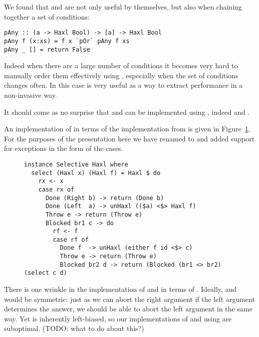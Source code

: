 We found that  and  are not only useful by
themselves, but also when chaining together a set of conditions:

\begin{verbatim}
pAny :: (a -> Haxl Bool) -> [a] -> Haxl Bool
pAny f (x:xs) = f x `pOr` pAny f xs
pAny _ [] = return False
\end{verbatim}

Indeed when there are a large number of conditions it becomes very
hard to manually order them effectively using , especially
when the set of conditions changes often. In this case  is
very useful as a way to extract performance in a non-invasive way.

It should come as no surprise that  and  can be
implemented using , indeed  and
.

An implementation of  in terms of the \Haxl implementation
from \citet{marlow2014haxl} is given in Figure~\ref{fig-haxl-select}.  For the
purposes of the presentation here we have renamed  to
 and added support for exceptions in the form of the
 cases.

\begin{figure}
\begin{verbatim}
instance Selective Haxl where
  select (Haxl x) (Haxl f) = Haxl $ do
    rx <- x
    case rx of
      Done (Right b) -> return (Done b)
      Done (Left  a) -> unHaxl (($a) <$> Haxl f)
      Throw e -> return (Throw e)
      Blocked br1 c -> do
        rf <- f
        case rf of
          Done f  -> unHaxl (either f id <$> c)
          Throw e -> return (Throw e)
          Blocked br2 d -> return (Blocked (br1 <> br2) (select c d)
\end{verbatim}
\label{fig-haxl-select}
\end{figure}

There is one wrinkle in the implementation of  and 
in terms of . Ideally,  and  would be
symmetric: just as we can abort the right argument if the left
argument determines the answer, we should be able to abort the left
argument in the same way. Yet  is inherently left-biased,
so our implementations of  and  using  are
suboptimal.  (TODO: what to do about this?)
